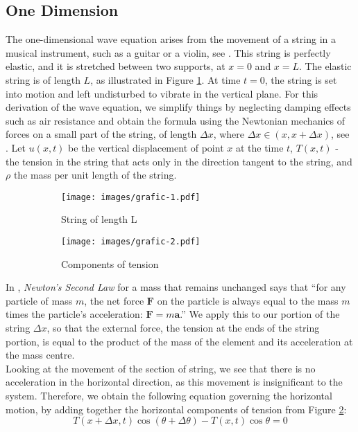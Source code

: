 \documentclass[a4paper, 12pt]{article}
\numberwithin{equation}{section}
\begin{document}
\subsection{One Dimension}
The one-dimensional wave equation arises from the movement of a string in a musical instrument,
such as a guitar or a violin, see \cite[Ch. 10, App. B]{BoyDiP}. This string is
perfectly elastic, and it is stretched between two supports, at $x=0$ and $x=L$.
The elastic string is of length $L$, as illustrated in Figure \ref{fig:1a}. At
time $t=0$, the string is set into motion and left undisturbed to vibrate in the
vertical plane. For this derivation of the wave equation, we simplify things by
neglecting damping effects such as air resistance and obtain the formula using
the Newtonian mechanics of forces on a small part of the string, of length
$\Delta x$, where $\Delta x \in (x, x+\Delta x)$, see \cite[Ch. 12.2]{Kr}. Let $u(x,t)$ be the
vertical displacement of point $x$ at the time $t$, $T(x,t)$ - the tension in
the string that acts only in the direction tangent to the string, and $\rho$ the
mass per unit length of the string. 
\begin{figure}[h] 
    \begin{subfigure}[t]{0.5\textwidth} 
        \texttt{[image: images/grafic-1.pdf]} 
        \caption{String of length L}
        \label{fig:1a}
    \end{subfigure} 
    \begin{subfigure}[t]{0.5\textwidth}
        \texttt{[image: images/grafic-2.pdf]}
        \caption{Components of tension}
        \label{fig:1b}
    \end{subfigure}     
\caption{}
\label{fig:1}
\end{figure}

In \cite[Ch. 1.4]{Tay}, \emph{Newton's Second Law} for a mass that remains
unchanged says that ``for any particle of mass $m$, the net force
$\boldsymbol{F}$ on the particle is always equal to the mass $m$ times the
particle's acceleration: $\boldsymbol{F} = m \boldsymbol{a}$.'' We apply this to
our portion of the string $\Delta x$, so that the external force, the tension at
the ends of the string portion, is equal to the product of the mass of the element
and its acceleration at the mass centre. \\

Looking at the movement of the section of string, we see that there is no
acceleration in the horizontal direction, as this movement is insignificant to
the system. Therefore, we obtain the following equation governing the horizontal
motion, by adding together the horizontal components of tension from Figure
\ref{fig:1b}:
\begin {equation} \label{eq1}
    T(x+\Delta x,t)\cos{(\theta + \Delta \theta)}-T(x,t)\cos{\theta}=0
\end {equation}
\end{document}
